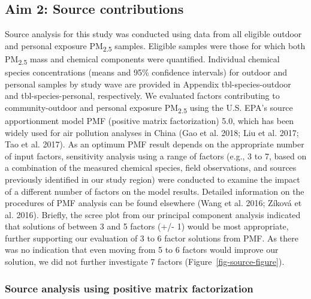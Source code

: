 \documentclass[
  letterpaper,
  DIV=11,
  numbers=noendperiod]{scrartcl}
\makeatletter
\renewenvironment{table}%
   {\renewcommand\familydefault\sfdefault
    \@float{table}}
   {\end@float}
\makeatother
\begin{document}
\begin{table}
{}

\end{table}%

\subsection{Aim 2: Source
contributions}\label{aim-2-source-contributions}

Source analysis for this study was conducted using data from all
eligible outdoor and personal exposure PM\textsubscript{2.5} samples.
Eligible samples were those for which both PM\textsubscript{2.5} mass
and chemical components were quantified. Individual chemical species
concentrations (means and 95\% confidence intervals) for outdoor and
personal samples by study wave are provided in Appendix
tbl-species-outdoor and tbl-species-personal, respectively.
 We evaluated factors contributing to community-outdoor
and personal exposure PM\textsubscript{2.5} using the U.S. EPA's source
apportionment model PMF (positive matrix factorization) 5.0, which has
been widely used for air pollution analyses in China (Gao et al. 2018;
Liu et al. 2017; Tao et al. 2017). As an optimum PMF result depends on
the appropriate number of input factors, sensitivity analysis using a
range of factors (e.g., 3 to 7, based on a combination of the measured
chemical species, field observations, and sources previously identified
in our study region) were conducted to examine the impact of a different
number of factors on the model results. Detailed information on the
procedures of PMF analysis can be found elsewhere (Wang et al. 2016;
Zíková et al. 2016). Briefly, the scree plot from our principal
component analysis indicated that solutions of between 3 and 5 factors
(+/- 1) would be most appropriate, further supporting our evaluation of
3 to 6 factor solutions from PMF. As there was no indication that even
moving from 5 to 6 factors would improve our solution, we did not
further investigate 7 factors (Figure~\ref{fig-source-figure}).

\subsubsection{Source analysis using positive matrix
factorization}\label{source-analysis-using-positive-matrix-factorization}
\end{document}
